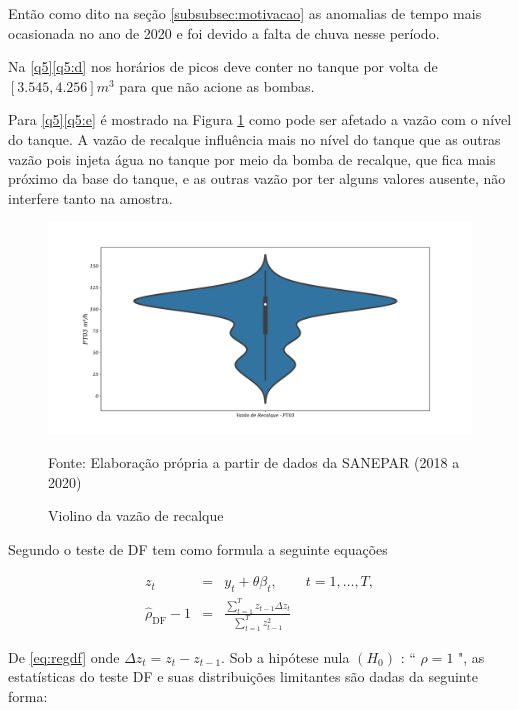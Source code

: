 \begin{itemize}
Então como dito na seção \ref{subsubsec:motivacao} as anomalias de tempo mais ocasionada no ano de 2020 e foi devido a falta de chuva nesse período.

Na \ref{q5}\ref{q5:d} nos horários de picos deve conter no tanque por volta de $[3.545,4.256] m^3$ para que não acione as bombas.

Para \ref{q5}\ref{q5:e} é mostrado na Figura \ref{fig:ft03} como pode ser afetado a vazão com o nível do tanque. A vazão de recalque influência mais no nível do tanque que as outras vazão pois injeta água no tanque por meio da bomba de recalque, que fica mais próximo da base do tanque, e as outras vazão por ter alguns valores ausente, não interfere tanto na amostra.

\begin{figure}[H]
	\centering
	\caption{Violino da vazão de recalque}
	\label{fig:ft03}
	\includegraphics[width=1\linewidth]{Resultados/Figuras/ft03}
	
	Fonte: Elaboração própria a partir de dados da SANEPAR (2018 a 2020)
\end{figure}


\end{itemize}

Segundo   o teste de DF tem como formula a seguinte equações

\begin{eqnarray}
	z_t&=& y_t+\theta \beta_t, \qquad t=1,\ldots, T, \label{eq:df3}\\	
\hat{\rho}_{\mathrm{DF}}-1&=&\frac{\sum_{t=1}^T z_{t-1} \Delta z_t}{\sum_{t=1}^T z_{t-1}^2} \label{eq:regdf}
\end{eqnarray}

De \eqref{eq:regdf} onde $\Delta z_t=z_t-z_{t-1}$. Sob a hipótese nula $\left(H_0\right)$ : `` $\rho=1$ ", as estatísticas do teste DF e suas distribuições limitantes são dadas da seguinte forma:


